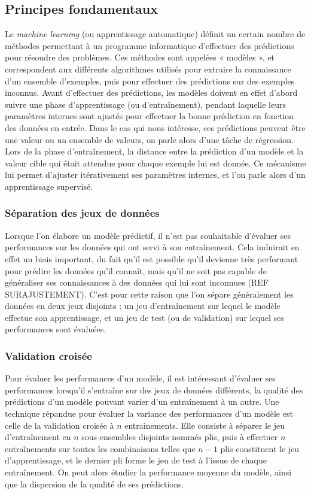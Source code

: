 \subsection{Principes fondamentaux}

Le \emph{machine learning} (ou apprentissage automatique) définit un certain nombre de méthodes permettant à un programme informatique d'effectuer des prédictions pour résoudre des problèmes. Ces méthodes sont appelées « modèles », et correspondent aux différents algorithmes utilisés pour extraire la connaissance d'un ensemble d'exemples, puis pour effectuer des prédictions sur des exemples inconnus. Avant d'effectuer des prédictions, les modèles doivent en effet d'abord suivre une phase d'apprentissage (ou d'entraînement), pendant laquelle leurs paramètres internes sont ajustés pour effectuer la bonne prédiction en fonction des données en entrée. Dans le cas qui nous intéresse, ces prédictions peuvent être une valeur ou un ensemble de valeurs, on parle alors d'une tâche de régression. Lors de la phase d'entraînement, la distance entre la prédiction d'un modèle et la valeur cible qui était attendue pour chaque exemple lui est donnée. Ce mécanisme lui permet d'ajuster itérativement ses paramètres internes, et l'on parle alors d'un apprentissage supervisé.\\

\subsubsection{Séparation des jeux de données}
\par Lorsque l'on élabore un modèle prédictif, il n'est pas souhaitable d'évaluer ses performances sur les données qui ont servi à son entraînement. Cela induirait en effet un biais important, du fait qu'il est possible qu'il devienne très performant pour prédire les données qu'il connaît, mais qu'il ne soit pas capable de généraliser ses connaissances à des données qui lui sont inconnues (REF SURAJUSTEMENT). C'est pour cette raison que l'on sépare généralement les données en deux jeux disjoints : un jeu d'entraînement sur lequel le modèle effectue son apprentissage, et un jeu de test (ou de validation) sur lequel ses performances sont évaluées.

\subsubsection{Validation croisée}
\par Pour évaluer les performances d'un modèle, il est intéressant d'évaluer ses performances lorsqu'il s'entraîne sur des jeux de données différents, la qualité des prédictions d'un modèle pouvant varier d'un entraînement à un autre. Une technique répandue pour évaluer la variance des performances d'un modèle est celle de la validation croisée à $n$ entraînements. Elle consiste à séparer le jeu d'entraînement en $n$ sous-ensembles disjoints nommés plis, puis à effectuer $n$ entraînements sur toutes les combinaisons telles que $n-1$ plis constituent le jeu d'apprentissage, et le dernier pli forme le jeu de test à l'issue de chaque entraînement. On peut alors étudier la performance moyenne du modèle, ainsi que la dispersion de la qualité de ses prédictions.


